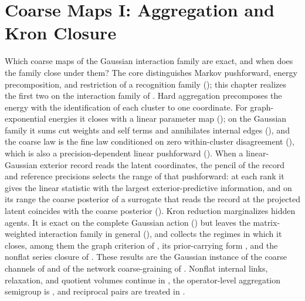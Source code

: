 \chapter{Coarse Maps I: Aggregation and Kron Closure}
\label{ch:gaussian-coarsegraining}

Which coarse maps of the Gaussian interaction family are exact, and when does
the family close under them? The core distinguishes Markov pushforward, energy
precomposition, and restriction of a recognition family
(); this chapter realizes the first two on the
interaction family of . Hard aggregation
precomposes the energy with the identification of each cluster to one
coordinate. For graph-exponential energies it closes with a linear parameter
map (); on the Gaussian family it sums
cut weights and self terms and annihilates internal edges
(), and the coarse law is the fine law
conditioned on zero within-cluster disagreement
(), which is also a precision-dependent
linear pushforward (). When a
linear-Gaussian exterior record reads the latent coordinates, the pencil of the
record and reference precisions selects the range of that pushforward: at each
rank it gives the linear statistic with the largest exterior-predictive
information, and on its range the coarse posterior of a surrogate that reads the
record at the projected latent coincides with the coarse posterior
(). Kron reduction
marginalizes hidden agents. It is exact on the complete Gaussian action
() but leaves the matrix-weighted
interaction family in general (), and
 collects the regimes in which it closes, among them
the graph criterion of , its
prior-carrying form , and the nonflat series
closure of . These results are the Gaussian
instance of the coarse channels of  and of the network
coarse-graining of . Nonflat internal links,
relaxation, and quotient volumes continue in , the
operator-level aggregation semigroup is ,
and reciprocal pairs are treated in .


